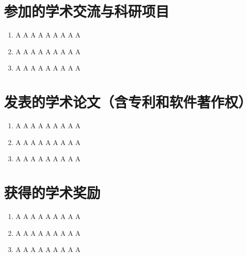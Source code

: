 
\begin{publications}

\section{参加的学术交流与科研项目}

\begin{enumerate}[itemsep = 0pt, parsep = 0pt, label = (\arabic*)]
\item A A A A A A A A A
\item A A A A A A A A A
\item A A A A A A A A A
\end{enumerate}

\section{发表的学术论文（含专利和软件著作权）}

\begin{enumerate}[itemsep = 0pt, parsep = 0pt, label = (\arabic*)]
\item A A A A A A A A A
\item A A A A A A A A A
\item A A A A A A A A A
\end{enumerate}

\section{获得的学术奖励}
\begin{enumerate}[itemsep = 0pt, parsep = 0pt, label = (\arabic*)]
\item A A A A A A A A A
\item A A A A A A A A A
\item A A A A A A A A A
\end{enumerate}

\end{publications}
